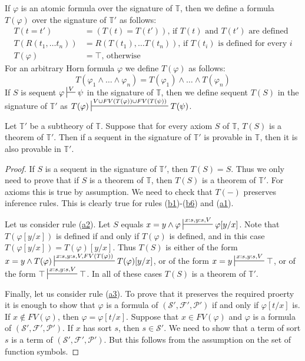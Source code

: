 \documentclass[reqno]{amsart}
\newcommand{\axref}[1]{(\hyperref[ax:#1]{#1})}
\theoremstyle{definition}
\theoremstyle{remark}
\numberwithin{figure}{section}
\begin{document}
If $\varphi$ is an atomic formula over the signature of $\mathbb{T}$, then we define a formula $T(\varphi)$ over the signature of $\mathbb{T}'$ as follows:
\begin{align*}
T(t = t') & = (T(t) = T(t')) \text{, if $T(t)$ and $T(t')$ are defined} \\
T(R(t_1, \ldots t_n)) & = R(T(t_1), \ldots T(t_n)) \text{, if $T(t_i)$ is defined for every $i$} \\
T(\varphi) & = \top \text{, otherwise}
\end{align*}
For an arbitrary Horn formula $\varphi$ we define $T(\varphi)$ as follows:
\[ T(\varphi_1 \land \ldots \land \varphi_n) = T(\varphi_1) \land \ldots \land T(\varphi_n) \]
If $S$ is sequent $\varphi \sststile{}{V} \psi$ in the signature of $\mathbb{T}$,
then we define sequent $T(S)$ in the signature of $\mathbb{T}'$ as $T(\varphi) \sststile{}{V \cup FV(T(\varphi)) \cup FV(T(\psi))} T(\psi)$.

\begin{lem}[mono]
Let $\mathbb{T}'$ be a subtheory of $\mathbb{T}$.
Suppose that for every axiom $S$ of $\mathbb{T}$, $T(S)$ is a theorem of $\mathbb{T}'$.
Then if a sequent in the signature of $\mathbb{T}'$ is provable in $\mathbb{T}$, then it is also provable in $\mathbb{T}'$.
\end{lem}
\begin{proof}
If $S$ is a sequent in the signature of $\mathbb{T}'$, then $T(S) = S$.
Thus we only need to prove that if $S$ is a theorem of $\mathbb{T}$, then $T(S)$ is a theorem of $\mathbb{T}'$.
For axioms this is true by assumption.
We need to check that $T(-)$ preserves inference rules.
This is clearly true for rules \axref{b1}-\axref{b6} and \axref{a1}.

Let us consider rule \axref{a2}.
Let $S$ equals $x = y \land \varphi \sststile{}{x:s,y:s,V} \varphi[y/x]$.
Note that $T(\varphi[y/x])$ is defined if and only if $T(\varphi)$ is defined, and in this case $T(\varphi[y/x]) = T(\varphi)[y/x]$.
Thus $T(S)$ is either of the form $x = y \land T(\varphi) \sststile{}{x:s,y:s,V,FV(T(\varphi))} T(\varphi)[y/x]$,
or of the form $x = y \sststile{}{x:s,y:s,V} \top$, or of the form $\top \sststile{}{x:s,y:s,V} \top$.
In all of these cases $T(S)$ is a theorem of $\mathbb{T}'$.

Finally, let us consider rule \axref{a3}.
To prove that it preserves the required proerty it is enough to show that $\varphi$ is a formula of $(\mathcal{S}',\mathcal{F}',\mathcal{P}')$ if and only if $\varphi[t/x]$ is.
If $x \notin FV(\varphi)$, then $\varphi = \varphi[t/x]$.
Suppose that $x \in FV(\varphi)$ and $\varphi$ is a formula of $(\mathcal{S}',\mathcal{F}',\mathcal{P}')$.
If $x$ has sort $s$, then $s \in \mathcal{S}'$.
We need to show that a term of sort $s$ is a term of $(\mathcal{S}',\mathcal{F}',\mathcal{P}')$.
But this follows from the assumption on the set of function symbols.
\end{proof}
\end{document}
